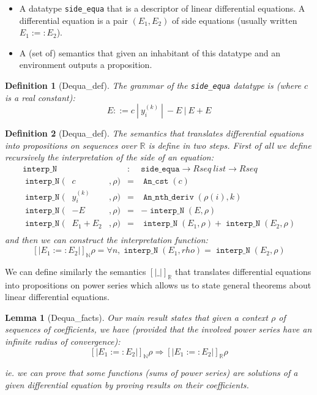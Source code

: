 \documentclass[submission,copyright]{eptcs}
\newcommand{\N}{\mathbb{N}}
\newcommand{\R}{\mathbb{R}}
\DeclareMathOperator{\C}{\mathtt{An\_cst}}
\DeclareMathOperator{\Dn}{\mathtt{An\_nth\_deriv}}
\DeclareMathOperator{\IN}{\mathtt{interp\_N}}
\newtheorem{definition}{Definition}
\newtheorem{lemma}{Lemma}
\begin{document}
\begin{itemize}
 \item A datatype \texttt{side\_equa} that is a descriptor of linear 
   differential equations. A differential equation is a pair $(E_1,E_2)$
	of side equations (usually written $E_1 :=: E_2$).
 
 \item A (set of) semantics that given an inhabitant of this datatype
	and an environment outputs a proposition.
\end{itemize}

\begin{definition}[Dequa\_def] The grammar of the \texttt{side\_equa}
datatype is (where $c$ is a real constant):
$$E ::= c ~|~ y_i^{(k)} ~|~ - E ~|~ E + E$$\end{definition}


\begin{definition}[Dequa\_def] The semantics that translates differential
equations into propositions on sequences over $\R$ is define in two steps.
First of all we define recursively the interpretation of the side
of an equation:$$\begin{array}{lclcl}
\IN{}& & & : & \texttt{side\_equa} \rightarrow Rseq~list \rightarrow Rseq \\
\IN{}(& c &, \rho) & = & \C{}(c)\\
\IN{}(& y_i^{(k)} &, \rho) & = & \Dn{}(\rho(i),k) \\
\IN{}(& - E &, \rho) & = & - \IN{}(E,\rho)\\
\IN{}(& E_1 + E_2 &, \rho) & = & \IN{}(E_1,\rho) + \IN{}(E_2,\rho)\\
\end{array}$$
and then we can construct the interpretation function:
$$\left[\left| E_1 :=: E_2 \right|\right]_\N \rho = \forall n,
\IN{}(E_1,rho) = \IN{}(E_2,\rho)$$\end{definition}

We can define similarly the semantics $\left[\left| \_ \right|\right]_\R$
that translates differential equations into propositions on power series
which allows us to state general theorems about linear differential
equations.

\begin{lemma}[Dequa\_facts] Our main result states that given a context
$\rho$ of sequences of coefficients, we have (provided that the involved
power series have an infinite radius of convergence):
$$\left[\left| E_1 :=: E_2 \right|\right]_\N \rho \Rightarrow
\left[\left| E_1 :=: E_2 \right|\right]_\R \rho$$

ie. we can prove that some functions (sums of power series) are solutions
of a given differential equation by proving results on their coefficients.
\end{lemma}
\end{document}
